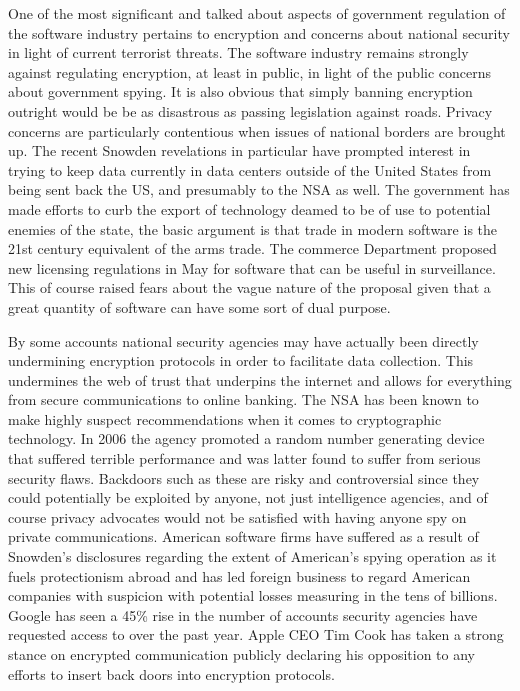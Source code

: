 One of the most significant and talked about aspects of government regulation of the software industry pertains to encryption and concerns about national security in light of current terrorist threats.\autocite[]{TerroristData}
The software industry remains strongly against regulating encryption, at least in public, in light of the public concerns about government spying.\autocite[]{TerroristData}
It is also obvious that simply banning encryption outright would be be as disastrous as passing legislation against roads.\autocite[]{TerroristData}
Privacy concerns are particularly contentious when issues of national borders are brought up. The recent Snowden revelations in particular have prompted interest in trying to keep data currently in data centers outside of the United States from being sent back the US, and presumably to the NSA as well.\autocite[]{OffMyCloud}
The government has made efforts to curb the export of technology deamed to be of use to potential enemies of the state, the basic argument is that trade in modern software is the 21st century equivalent of the arms trade.\autocite[]{HeatsUpSurveillance}
The commerce Department proposed new licensing regulations in May for software that can be useful in surveillance. This of course raised fears about the vague nature of the proposal given that a great quantity of software can have some sort of dual purpose.\autocite[]{HeatsUpSurveillance}

By some accounts national security agencies may have actually been directly undermining encryption protocols in order to facilitate data collection.\autocite[]{CrackedCredibility}
This undermines the web of trust that underpins the internet and allows for everything from secure communications to online banking.\autocite[]{CrackedCredibility}
The NSA has been known to make highly suspect recommendations when it comes to cryptographic technology. In 2006 the agency promoted a random number generating device that suffered terrible performance and was latter found to suffer from serious security flaws.\autocite[]{CrackedCredibility}
Backdoors such as these are risky and controversial since they could potentially be exploited by anyone, not just intelligence agencies, and of course privacy advocates would not be satisfied with having anyone spy on private communications.\autocite[]{CrackedCredibility}
American software firms have suffered as a result of Snowden's disclosures regarding the extent of American's spying operation as it fuels protectionism abroad and has led foreign business to regard American companies with suspicion with potential losses measuring in the tens of billions.\autocite[]{CrackedCredibility}
Google has seen a 45\% rise in the number of accounts security agencies have requested access to over the past year.\autocite[]{DataRequests}
Apple CEO Tim Cook has taken a strong stance on encrypted communication publicly declaring his opposition to any efforts to insert back doors into encryption protocols.\autocite[]{StrongEncryptionCook}
